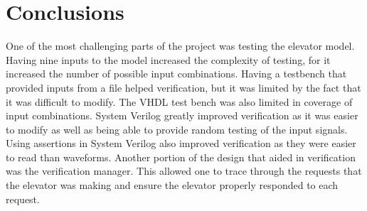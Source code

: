 \documentclass[journal]{IEEEtran}
\begin{document}
\section{Conclusions}
One of the most challenging parts of the project was testing the elevator model. Having nine inputs to the model increased the complexity of testing, for it increased the number of possible input combinations. Having a testbench that provided inputs from a file helped verification, but it was limited by the fact that it was difficult to modify. The VHDL test bench was also limited in coverage of input combinations. System Verilog greatly improved verification as it was easier to modify as well as being able to provide random testing of the input signals. Using assertions in System Verilog also improved verification as they were easier to read than waveforms. Another portion of the design that aided in verification was the verification manager. This allowed one to trace through the requests that the elevator was making and ensure the elevator properly responded to each request.


%



\newpage
\appendices
\onecolumn
\end{document}
